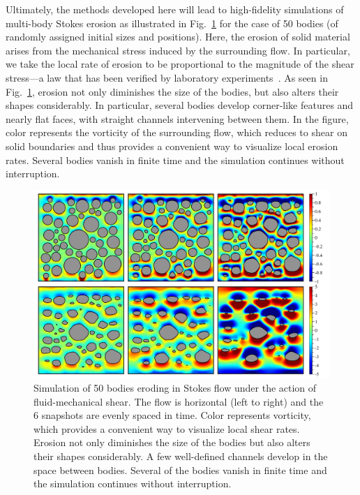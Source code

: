 \documentclass[preprint, 10pt]{elsarticle}
\begin{document}
Ultimately, the methods developed here will lead to high-fidelity simulations of multi-body Stokes erosion as illustrated in Fig.~\ref{fig:50bodies} for the case of 50 bodies (of randomly assigned initial sizes and positions). Here, the erosion of solid material arises from the mechanical stress induced by the surrounding flow. In particular, we take the local rate of erosion to be proportional to the magnitude of the shear stress---a law that has been verified by laboratory experiments~\cite{ris-moo-chi-she-zha2012}. As seen in Fig.~\ref{fig:50bodies}, erosion not only diminishes the size of the bodies, but also alters their shapes considerably. In particular, several bodies develop corner-like features and nearly flat faces, with straight channels intervening between them. In the figure, color represents the vorticity of the surrounding flow, which reduces to shear on solid boundaries and thus provides a convenient way to visualize local erosion rates. Several bodies vanish in finite time and the simulation continues without interruption.

\begin{figure}%
\begin{center}
\includegraphics[width = 0.80 \textwidth]{./figs/50bod.pdf}
\caption{\label{fig:50bodies} Simulation of 50 bodies eroding in Stokes flow under the action of fluid-mechanical shear. The flow is horizontal (left to right) and the 6 snapshots are evenly spaced in time. Color represents vorticity, which provides a convenient way to visualize local shear rates. Erosion not only diminishes the size of the bodies but also alters their shapes considerably. A few well-defined channels develop in the space between bodies. Several of the bodies vanish in finite time and the simulation continues without interruption.
}
\end{center}
\end{figure}
\end{document}
